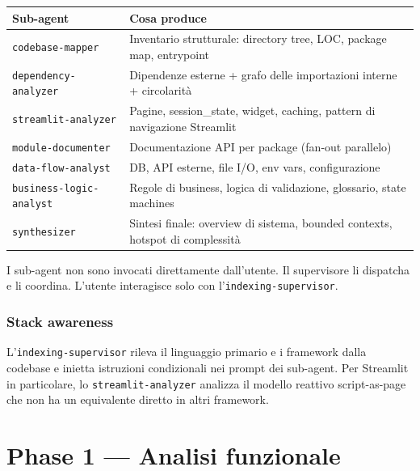 \documentclass[12pt,a4paper,twoside]{book}
\begin{document}
\begin{center}
\begin{longtable}{lp{8cm}}
\toprule
\textbf{Sub-agent} & \textbf{Cosa produce} \\
\midrule
\endhead
\texttt{codebase-mapper} & Inventario strutturale: directory tree, LOC, package map, entrypoint \\
\texttt{dependency-analyzer} & Dipendenze esterne + grafo delle importazioni interne + circolarità \\
\texttt{streamlit-analyzer} & Pagine, session\_state, widget, caching, pattern di navigazione Streamlit \\
\texttt{module-documenter} & Documentazione API per package (fan-out parallelo) \\
\texttt{data-flow-analyst} & DB, API esterne, file I/O, env vars, configurazione \\
\texttt{business-logic-analyst} & Regole di business, logica di validazione, glossario, state machines \\
\texttt{synthesizer} & Sintesi finale: overview di sistema, bounded contexts, hotspot di complessità \\
\bottomrule
\end{longtable}
\end{center}

\begin{notabox}
I sub-agent non sono invocati direttamente dall'utente. Il supervisore li dispatcha e li coordina. L'utente interagisce solo con l'\texttt{indexing-supervisor}.
\end{notabox}

\subsection{Stack awareness}

L'\texttt{indexing-supervisor} rileva il linguaggio primario e i framework dalla codebase e inietta istruzioni condizionali nei prompt dei sub-agent. Per Streamlit in particolare, lo \texttt{streamlit-analyzer} analizza il modello reattivo script-as-page che non ha un equivalente diretto in altri framework.

\chapter{Phase 1 — Analisi funzionale}
\end{document}
